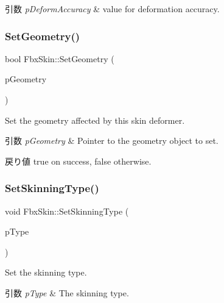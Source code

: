 \begin{DoxyParams}{引数}
{\em p\+Deform\+Accuracy} & value for deformation accuracy. \\
\hline
\end{DoxyParams}
\mbox{\label{class_fbx_skin_a975c3ebb7a979bd28c7d9c9c236c09ee}} 
\subsubsection{\texorpdfstring{Set\+Geometry()}{SetGeometry()}}
{\footnotesize\ttfamily bool Fbx\+Skin\+::\+Set\+Geometry (\begin{DoxyParamCaption}\item[{\hyperlink{class_fbx_geometry}{Fbx\+Geometry} $\ast$}]{p\+Geometry }\end{DoxyParamCaption})}

Set the geometry affected by this skin deformer. 
\begin{DoxyParams}{引数}
{\em p\+Geometry} & Pointer to the geometry object to set. \\
\hline
\end{DoxyParams}
\begin{DoxyReturn}{戻り値}
{\ttfamily true} on success, {\ttfamily false} otherwise. 
\end{DoxyReturn}
\mbox{\label{class_fbx_skin_afb0eae9feba38a19266fd0d20f84fd40}} 
\subsubsection{\texorpdfstring{Set\+Skinning\+Type()}{SetSkinningType()}}
{\footnotesize\ttfamily void Fbx\+Skin\+::\+Set\+Skinning\+Type (\begin{DoxyParamCaption}\item[{\hyperlink{class_fbx_skin_aee398789ebed22fa97269a26c6049a16}{E\+Type}}]{p\+Type }\end{DoxyParamCaption})}

Set the skinning type. 
\begin{DoxyParams}{引数}
{\em p\+Type} & The skinning type. \\
\hline
\end{DoxyParams}


